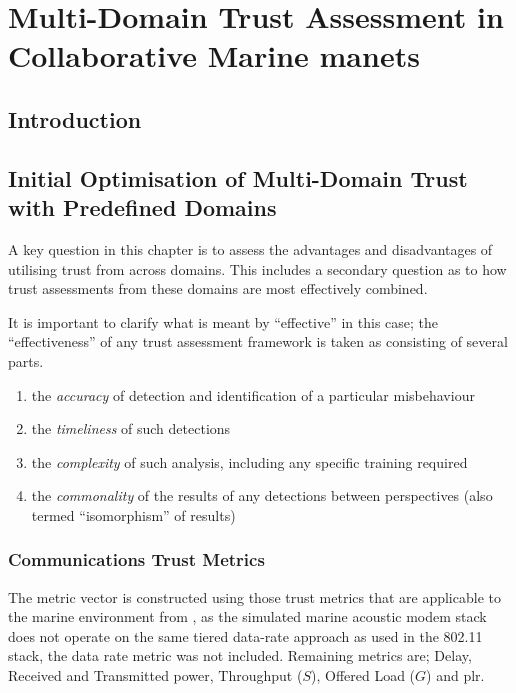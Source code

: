 \def\ChapterTitle{}

\chapter{Multi-Domain Trust Assessment in Collaborative Marine \glspl{manet}}
\label{ch:multi_domain}

\section{Introduction}


\section{Initial Optimisation of Multi-Domain Trust with Predefined Domains}

A key question in this chapter is to assess the advantages and disadvantages of utilising trust from across domains. 
This includes a secondary question as to how trust assessments from these domains are most effectively combined. 

It is important to clarify what is meant by ``effective'' in this case; the ``effectiveness'' of any trust assessment framework is taken as consisting of several parts.

\begin{enumerate}
  \item the \emph{accuracy} of detection and identification of a particular misbehaviour
  \item the \emph{timeliness} of such detections
  \item the \emph{complexity} of such analysis, including any specific training required
  \item the \emph{commonality} of the results of any detections between perspectives (also termed ``isomorphism'' of results)
\end{enumerate}



\subsection{Communications Trust Metrics}

The metric vector is constructed using those trust metrics that are applicable to the marine environment from \cite{Guo2012}, as the simulated marine acoustic modem stack does not operate on the same tiered data-rate approach as used in the 802.11 stack, the data rate metric was not included. Remaining metrics are; Delay, Received and Transmitted power, Throughput ($S$), Offered Load ($G$) and \gls{plr}.

